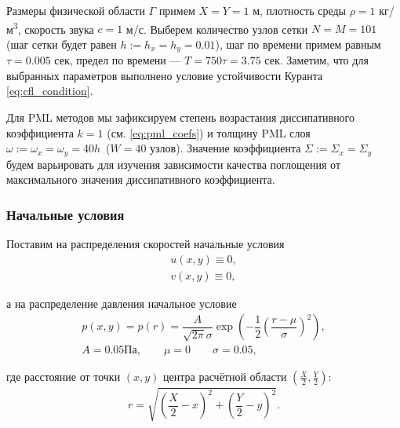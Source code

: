 Размеры физической области $\Gamma$ примем $X=Y=1$ м, плотность среды $\rho = 1$ кг/м\textsuperscript{3}, скорость звука $c=1$ м/с. Выберем количество узлов сетки $N=M=101$ (шаг сетки будет равен $h:=h_x=h_y=0.01$), шаг по времени примем равным $\tau = 0.005$ сек, предел по времени --- $T = 750\tau = 3.75$ сек. Заметим, что для выбранных параметров выполнено условие устойчивости Куранта \eqref{eq:cfl_condition}.

Для PML методов мы зафиксируем степень возрастания диссипативного коэффициента $k=1$ (см. \eqref{eq:pml_coefs}) и толщину PML слоя $\omega := \omega_x = \omega_y = 40 h$~($W=40$ узлов). Значение коэффициента $\Sigma:=\Sigma_x = \Sigma_y$ будем варьировать для изучения зависимости качества поглощения от максимального значения диссипативного коэффициента.

\subsubsection{Начальные условия}

Поставим на распределения скоростей начальные условия
\begin{equation*}
\begin{gathered}
    u(x,y) \equiv 0 ,\\
    v(x,y) \equiv 0 ,
\end{gathered}
\end{equation*}

\noindent а на распределение давления начальное условие
\begin{equation}
\begin{gathered}
    p(x,y) = p(r) = \dfrac{A}{\sqrt{2\pi}\sigma}  \exp\left(-\dfrac{1}{2}\left(\dfrac{r - \mu}{\sigma}\right)^2\right) ,\\
    A=0.05 \text{Па} , \qquad \mu = 0 \qquad \sigma=0.05 ,
\end{gathered}
\label{eq:gauss_pressure}
\end{equation}

\noindent где расстояние от точки $(x,y)$ центра расчётной области $\left(\frac{X}{2},\frac{Y}{2}\right)$:
$$r = \sqrt{\left(\frac{X}{2} - x\right)^2+\left(\frac{Y}{2} - y\right)^2} .$$

